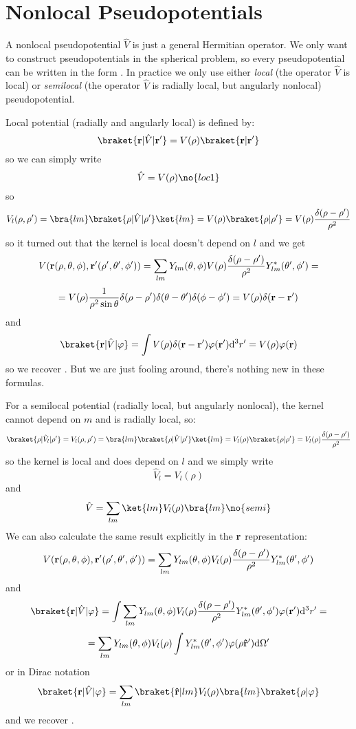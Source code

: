 \section{Nonlocal Pseudopotentials}

A nonlocal pseudopotential $\hat V$ is just a general Hermitian operator.
We only want to construct pseudopotentials in the spherical problem, so every
pseudopotential can be written in the form .
In practice we only use either {\it local\/} (the operator $\hat V$ is local)
or {\it semilocal\/} (the operator $\hat V$ is radially local, but angularly
nonlocal) pseudopotential.

Local potential (radially and angularly local) is defined by:
$$\braket{{\bf r}|\hat V|{\bf r'}}=V(\rho)\braket{{\bf r}|{\bf r'}}$$
so we can simply write
$$\hat V=V(\rho)\no{loc1}$$
so
$$V_l(\rho,\rho')
=\bra{lm}\braket{\rho|\hat V|\rho'}\ket{lm}
=V(\rho)\braket{\rho|\rho'}
=V(\rho){\delta(\rho-\rho')\over\rho^2}$$
so it turned out that the kernel is local doesn't depend on $l$ and we get
$$V({\bf r}(\rho,\theta,\phi), {\bf r'}(\rho',\theta',\phi'))=
\sum_{lm}Y_{lm}(\theta,\phi) V(\rho){\delta(\rho-\rho')\over\rho^2} Y_{lm}^*(\theta',\phi')=
$$
$$
=V(\rho){1\over\rho^2\sin\theta}
\delta(\rho-\rho')\delta(\theta-\theta')\delta(\phi-\phi')=
V(\rho)\delta({\bf r}-{\bf r}')$$
and
$$\braket{{\bf r}|\hat V|\varphi}=\int 
V(\rho)\delta({\bf r}-{\bf r}')
\varphi({\bf r'})\d^3r'=V(\rho)\varphi({\bf r})$$
so we recover . But we are just fooling around, there's nothing new in these formulas.

For a semilocal potential (radially local, but angularly nonlocal), the kernel
cannot depend on $m$ and is radially local, so:
$$\braket{\rho|\hat V_l|\rho'}=V_l(\rho,\rho')
=\bra{lm}\braket{\rho|\hat V|\rho'}\ket{lm}
=V_l(\rho)\braket{\rho|\rho'}
=V_l(\rho){\delta(\rho-\rho')\over\rho^2}$$
so the kernel is local and does depend on $l$ and we simply write
$$\hat V_l=V_l(\rho)$$
and
$$\hat V=\sum_{lm} \ket{lm}V_l(\rho)\bra{lm}\no{semi}$$
We can also calculate the same result explicitly in the $\bf r$
representation:
$$V({\bf r}(\rho,\theta,\phi), {\bf r'}(\rho',\theta',\phi'))=
\sum_{lm}Y_{lm}(\theta,\phi) V_l(\rho){\delta(\rho-\rho')\over\rho^2} Y_{lm}^*(\theta',\phi')
$$
and
$$\braket{{\bf r}|\hat V|\varphi}=\int 
\sum_{lm}Y_{lm}(\theta,\phi) V_l(\rho){\delta(\rho-\rho')\over\rho^2} Y_{lm}^*(\theta',\phi')
\varphi({\bf r'})\d^3r'=$$
$$=
\sum_{lm}Y_{lm}(\theta,\phi) V_l(\rho) \int Y_{lm}^*(\theta',\phi')
\varphi(\rho{\bf\hat r'}){\rm d}\Omega'
$$
or in Dirac notation
$$\braket{{\bf r}|\hat V|\varphi}=
\sum_{lm} \braket{{\bf\hat r}|lm}V_l(\rho) \bra{lm}\braket{\rho|\varphi}
$$
and we recover .

